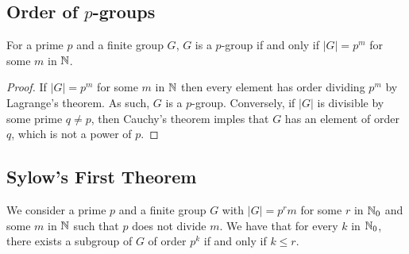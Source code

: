 \subsection{Order of $p$-groups} \label{6.3}

For a prime $p$ and a finite group $G$, $G$ is a $p$-group if
and only if $|G| = p^m$ for some $m$ in $\mathbb{N}$.

\begin{proof}
    If $|G| = p^m$ for some $m$ in $\mathbb{N}$ then every element has
    order dividing $p^m$ by Lagrange's theorem. As such, $G$ is a
    $p$-group. Conversely, if $|G|$ is divisible by some prime
    $q \neq p$, then Cauchy's theorem imples that $G$ has
    an element of order $q$, which is not a power of $p$.
\end{proof}

\subsection{Sylow's First Theorem} \label{6.4}

We consider a prime $p$ and a finite group $G$ with $|G| = p^rm$ 
for some $r$ in $\mathbb{N}_0$ and some $m$ in $\mathbb{N}$ such that $p$ 
does not divide $m$. We have that for every $k$ in $\mathbb{N}_0$,
there exists a subgroup of $G$ of order $p^k$ if and only if
$k \leq r$.

